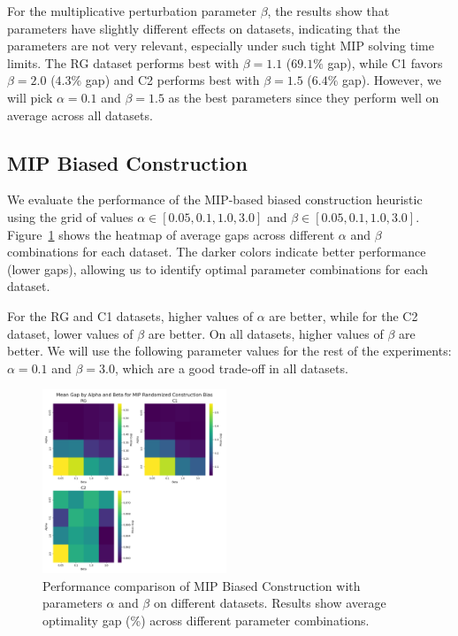 For the multiplicative perturbation parameter $\beta$, the results show that parameters have slightly different effects on datasets, indicating that the parameters are not very relevant, especially under such tight MIP solving time limits. The RG dataset performs best with $\beta = 1.1$ ($69.1\%$ gap), while C1 favors $\beta = 2.0$ ($4.3\%$ gap) and C2 performs best with $\beta = 1.5$ ($6.4\%$ gap). However, we will pick $\alpha = 0.1$ and $\beta = 1.5$ as the best parameters since they perform well on average across all datasets.


\subsection{MIP Biased Construction}

We evaluate the performance of the MIP-based biased construction heuristic
using the grid of values $\alpha \in [0.05, 0.1, 1.0, 3.0]$ and $\beta \in [0.05, 0.1, 1.0, 3.0]$.
Figure~\ref{fig:alpha_beta_grid_mip_randomized_construction_bias} shows the heatmap of average gaps across different $\alpha$ and $\beta$ combinations for each dataset.
The darker colors indicate better performance (lower gaps), allowing us to identify optimal parameter combinations for each dataset. 

For the RG and C1 datasets, higher values of $\alpha$ are better, while for the C2 dataset, lower values of $\beta$ are better. On all datasets, higher values of $\beta$ are better.
We will use the following parameter values for the rest of the experiments: $\alpha = 0.1$ and $\beta = 3.0$, which are a good trade-off in all datasets.

\begin{figure}[h]
    \centering
    \includegraphics[width=0.49\textwidth]{figures/alpha_beta_grid_mip_randomized_construction_bias.png}
    \caption{Performance comparison of MIP Biased Construction with parameters $\alpha$ and $\beta$ on different datasets. Results show average optimality gap (\%) across different parameter combinations.}
    \label{fig:alpha_beta_grid_mip_randomized_construction_bias} 
\end{figure} 


